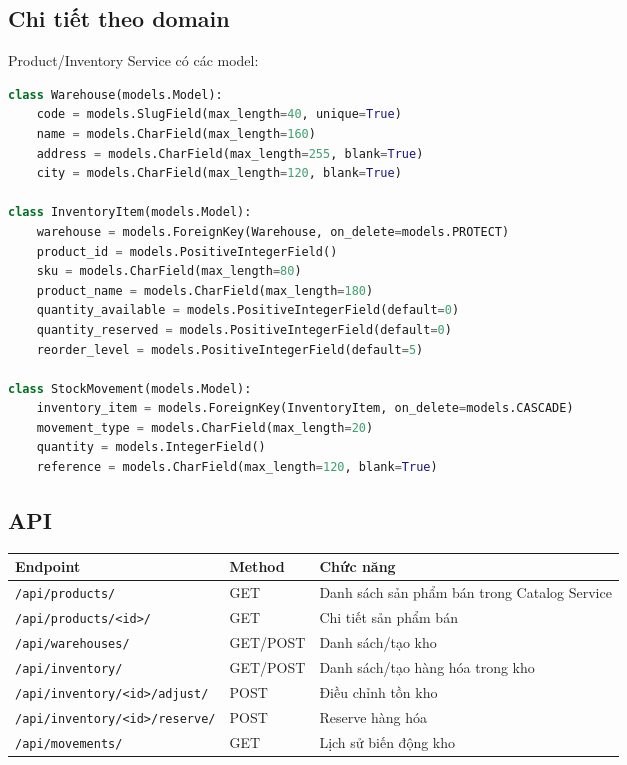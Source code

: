 \documentclass[12pt,a4paper]{report}
\begin{document}
\subsection{Chi tiết theo domain}

Product/Inventory Service có các model:

\begin{lstlisting}[style=code,language=Python]
class Warehouse(models.Model):
    code = models.SlugField(max_length=40, unique=True)
    name = models.CharField(max_length=160)
    address = models.CharField(max_length=255, blank=True)
    city = models.CharField(max_length=120, blank=True)

class InventoryItem(models.Model):
    warehouse = models.ForeignKey(Warehouse, on_delete=models.PROTECT)
    product_id = models.PositiveIntegerField()
    sku = models.CharField(max_length=80)
    product_name = models.CharField(max_length=180)
    quantity_available = models.PositiveIntegerField(default=0)
    quantity_reserved = models.PositiveIntegerField(default=0)
    reorder_level = models.PositiveIntegerField(default=5)

class StockMovement(models.Model):
    inventory_item = models.ForeignKey(InventoryItem, on_delete=models.CASCADE)
    movement_type = models.CharField(max_length=20)
    quantity = models.IntegerField()
    reference = models.CharField(max_length=120, blank=True)
\end{lstlisting}

\subsection{API}

\begin{longtable}{|p{5cm}|p{3cm}|p{6cm}|}
\hline
\textbf{Endpoint} & \textbf{Method} & \textbf{Chức năng} \\
\hline
\texttt{/api/products/} & GET & Danh sách sản phẩm bán trong Catalog Service \\
\hline
\texttt{/api/products/<id>/} & GET & Chi tiết sản phẩm bán \\
\hline
\texttt{/api/warehouses/} & GET/POST & Danh sách/tạo kho \\
\hline
\texttt{/api/inventory/} & GET/POST & Danh sách/tạo hàng hóa trong kho \\
\hline
\texttt{/api/inventory/<id>/adjust/} & POST & Điều chỉnh tồn kho \\
\hline
\texttt{/api/inventory/<id>/reserve/} & POST & Reserve hàng hóa \\
\hline
\texttt{/api/movements/} & GET & Lịch sử biến động kho \\
\hline
\end{longtable}
\end{document}
